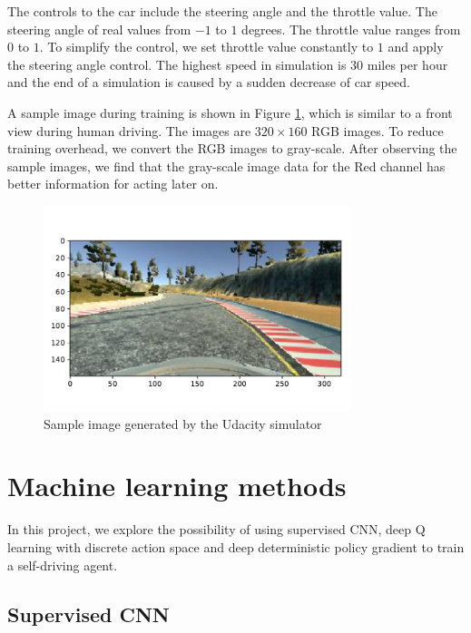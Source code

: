 \documentclass[a4paper]{article}
\begin{document}
The controls to the car include the steering angle and the throttle value. The steering angle of real values from $-1$ to $1$ degrees. The throttle value ranges from $0$ to $1$. To simplify the control, we set throttle value constantly to $1$ and apply the steering angle control. The highest speed in simulation is 30 miles per hour and the end of a simulation is caused by a sudden decrease of car speed.

A sample image during training is shown in Figure \ref{fig:sample_rgb}, which is similar to a front view during human driving. The images are $320 \times 160$ RGB images. To reduce training overhead, we convert the RGB images to gray-scale. After observing the sample images, we find that the gray-scale image data for the Red channel has better information for acting later on. 

\begin{figure}
    \centering
    \includegraphics[width=0.8\textwidth]{./figures/sample_rgb.pdf}
    \caption{ Sample image generated by the Udacity simulator }
    \label{fig:sample_rgb}
\end{figure}


\section{Machine learning methods}

In this project, we explore the possibility of using supervised CNN, deep Q learning\cite{mnih2015human} with discrete action space and deep deterministic policy gradient\cite{lillicrap2015continuous} to train a self-driving agent.

\subsection{Supervised CNN}
\end{document}
